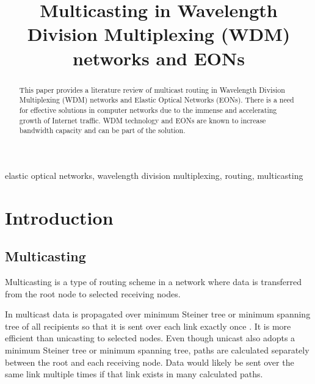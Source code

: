 \documentclass[conference]{IEEEtran}
\begin{document}
\title{Multicasting in Wavelength Division Multiplexing (WDM) networks and EONs}

\author{
\and
{}
}

\maketitle

\begin{abstract}
This paper provides a literature review of multicast routing in Wavelength Division Multiplexing (WDM) networks and Elastic Optical Networks (EONs). There is a need for effective solutions in computer networks due to the immense and accelerating growth of Internet traffic. WDM technology and EONs are known to increase bandwidth capacity and can be part of the solution.
\end{abstract}

\begin{IEEEkeywords}
elastic optical networks, wavelength division multiplexing, routing, multicasting
\end{IEEEkeywords}

\section{Introduction}

\subsection{Multicasting}
Multicasting is a type of routing scheme in a network where data is transferred from the root node to selected receiving nodes.

In multicast data is propagated over minimum Steiner tree or minimum spanning tree of all recipients so that it is sent over each link exactly once \cite{multicast_definition}. It is more efficient than unicasting to selected nodes. Even though unicast also adopts a minimum Steiner tree or minimum spanning tree, paths are calculated separately between the root and each receiving node. Data would likely be sent over the same link multiple times if that link exists in many calculated paths.
\end{document}
